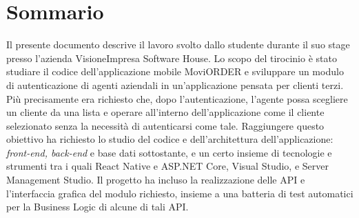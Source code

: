 \cleardoublepage
{}
{}
\begingroup
\let\clearpage\relax
\let\cleardoublepage\relax
\chapter*{Sommario}

Il presente documento descrive il lavoro svolto dallo studente \myName durante il suo stage presso l’azienda VisioneImpresa Software House.
Lo scopo del tirocinio è stato studiare il codice dell’applicazione mobile MoviORDER e sviluppare un modulo di autenticazione di agenti aziendali 
in un'applicazione pensata per clienti terzi. Più precisamente era richiesto che, dopo l’autenticazione, l’agente possa scegliere un cliente da una 
lista e operare all’interno dell’applicazione come il cliente selezionato senza la necessità di autenticarsi come tale.
Raggiungere questo obiettivo ha richiesto lo studio del codice e dell’architettura dell’applicazione: \textit{front-end, back-end} e base dati 
sottostante, e un certo insieme di tecnologie e strumenti tra i quali React Native e ASP.NET Core, Visual Studio, e Server Management Studio. Il progetto ha incluso la realizzazione delle API e l’interfaccia grafica del modulo richiesto, insieme a una batteria di test automatici per la Business Logic di alcune di tali API.


\endgroup
\vfill
